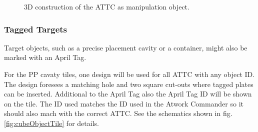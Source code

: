 \begin{figure}[h!]
	\centering
	\hspace{0.05\textwidth}
	\caption{3D construction of the ATTC as manipulation object.}%
	\label{fig:cubeObject}
\end{figure}

\subsubsection{Tagged Targets}

Target objects, such as a precise placement cavity or a container, might also be marked with an April Tag.

For the PP cavaty tiles, one design will be used for all ATTC with any object ID. The design foresees a matching hole and two square cut-outs where tagged plates can be inserted. Additional to the April Tag also the April Tag ID will be shown on the tile.
The ID used matches the ID used in the Atwork Commander so it should also mach with the correct ATTC.
See the schematics shown in fig. \ref{fig:cubeObjectTile} for details. 

